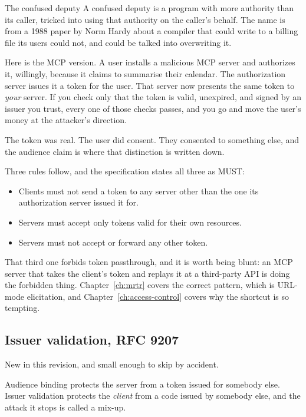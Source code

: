 \begin{dangerbox}{The confused deputy}
A confused deputy is a program with more authority than its caller, tricked into
using that authority on the caller's behalf. The name is from a 1988 paper by
Norm Hardy about a compiler that could write to a billing file its users could
not, and could be talked into overwriting it.

Here is the MCP version. A user installs a malicious MCP server and authorizes
it, willingly, because it claims to summarise their calendar. The authorization
server issues it a token for the user. That server now presents the same token
to \emph{your} server. If you check only that the token is valid, unexpired, and
signed by an issuer you trust, every one of those checks passes, and you go and
move the user's money at the attacker's direction.

The token was real. The user did consent. They consented to something else, and
the audience claim is where that distinction is written down.
\end{dangerbox}

Three rules follow, and the specification states all three as MUST:

\begin{itemize}[leftmargin=1.6em, itemsep=2pt]
\item Clients must not send a token to any server other than the one its
authorization server issued it for.
\item Servers must accept only tokens valid for their own resources.
\item Servers must not accept or forward any other token.
\end{itemize}

That third one forbids token passthrough, and it is worth being blunt: an MCP
server that takes the client's token and replays it at a third-party API is
doing the forbidden thing. Chapter~\ref{ch:mrtr} covers the correct pattern,
which is URL-mode elicitation, and Chapter~\ref{ch:access-control} covers why
the shortcut is so tempting.

\subsection{Issuer validation, RFC 9207}
\label{sec:issuer-validation}

New in this revision, and small enough to skip by accident.

Audience binding protects the server from a token issued for somebody else.
Issuer validation protects the \emph{client} from a code issued by somebody
else, and the attack it stops is called a mix-up.

